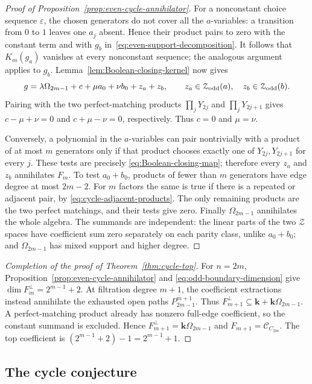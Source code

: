 \documentclass[reqno]{article}
\theoremstyle{plain} %
\theoremstyle{definition}
\theoremstyle{remark}
\newcommand{\K} {\mathbf{k}}
\newcommand {\CC}{\mathscr{C}}
\numberwithin{equation}{section}
\begin{document}
\begin{proof}[Proof of Proposition~\ref{prop:even-cycle-annihilator}]
For a nonconstant choice sequence $\varepsilon$, the chosen generators
do not cover all the $a$-variables: a transition from $0$ to $1$ leaves
one $a_j$ absent. Hence their product pairs to zero with the constant
term and with $g_b$ in~\eqref{eq:even-support-decomposition}.
It follows that $K_m(g_a)$ vanishes at every nonconstant sequence;
the analogous argument applies to $g_b$.
Lemma~\ref{lem:Boolean-closing-kernel} now gives
\[
g=\lambda\Omega_{2m-1}+c+\mu a_0+\nu b_0+z_a+z_b,
\qquad z_a\in\mathcal Z_{\rm odd}(a),\quad
z_b\in\mathcal Z_{\rm odd}(b).
\]
Pairing with the two perfect-matching products
$\prod_jY_{2j}$ and $\prod_jY_{2j+1}$ gives
$c-\mu+\nu=0$ and $c+\mu-\nu=0$, respectively.
Thus $c=0$ and $\mu=\nu$.

Conversely, a polynomial in the $a$-variables can pair nontrivially with
a product of at most $m$ generators only if that product chooses exactly
one of $Y_{2j},Y_{2j+1}$ for every $j$. These tests are precisely
\eqref{eq:Boolean-closing-map}; therefore every $z_a$ and $z_b$
annihilates $F_m$. To test $a_0+b_0$, products of fewer than $m$
generators have edge degree at most $2m-2$. For $m$ factors the same is
true if there is a repeated or adjacent pair, by
\eqref{eq:cycle-adjacent-products}. The only remaining products are the
two perfect matchings, and their tests give zero. Finally
$\Omega_{2m-1}$ annihilates the whole algebra.
The summands are independent: the linear parts of the two $\mathcal Z$
spaces have coefficient sum zero separately on each parity class, unlike
$a_0+b_0$; and $\Omega_{2m-1}$ has mixed support and higher degree.
\end{proof}

\begin{proof}[Completion of the proof of Theorem~\ref{thm:cycle-top}]
For $n=2m$, Proposition~\ref{prop:even-cycle-annihilator} and
\eqref{eq:odd-boundary-dimension} give
$\dim F_m^\perp=2^{m-1}+2$.
At filtration degree $m+1$, the coefficient extractions instead
annihilate the exhausted open paths $P_{2m-1}^{m+1}$.
Thus $F_{m+1}^\perp\subseteq\K+\K\Omega_{2m-1}$.
A perfect-matching product already has nonzero full-edge coefficient,
so the constant summand is excluded. Hence
$F_{m+1}^\perp=\K\Omega_{2m-1}$ and
$F_{m+1}=\CC_{C_{2m}}$. The top coefficient is
$(2^{m-1}+2)-1=2^{m-1}+1$.
\end{proof}

\subsection{The cycle conjecture}
\label{sec:cycle-conjecture}
\end{document}
